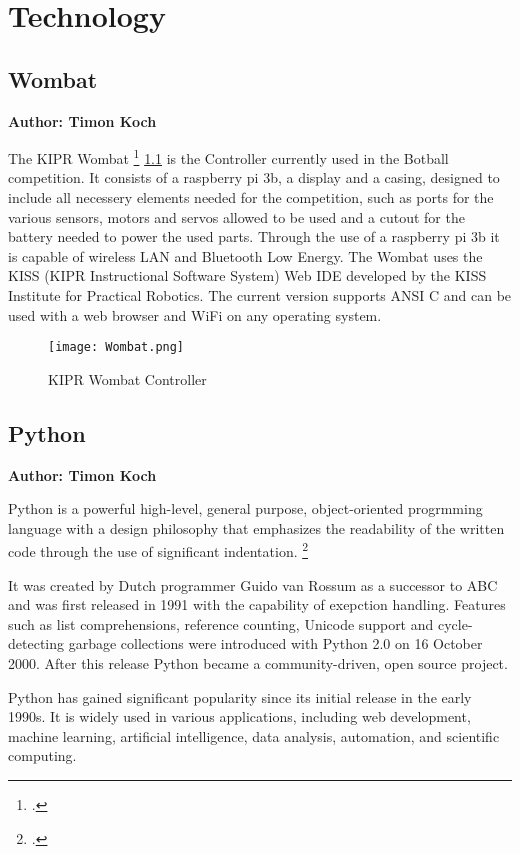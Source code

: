\chapter{Technology}


\section{Wombat}
\textbf{Author: Timon Koch}

The KIPR Wombat \footcite{wombat-controller} \ref{fig:wombat} is the Controller currently used in the Botball competition. It consists of a raspberry pi 3b, a display and a casing, designed to include all necessery elements needed for the competition, such as ports for the various sensors, motors and servos allowed to be used and a cutout for the battery needed to power the used parts. Through the use of a raspberry pi 3b it is capable of wireless LAN and Bluetooth Low Energy. The Wombat uses the KISS (KIPR Instructional Software System) Web IDE developed by the KISS Institute for Practical Robotics. The current version supports ANSI C and can be used with a web browser and WiFi on any operating system.

\begin{figure}[h]
	\centering
	\texttt{[image: Wombat.png]} 
	\caption{KIPR Wombat Controller}
    \label{fig:wombat}
\end{figure}


\section{Python}
\textbf{Author: Timon Koch}

Python is a powerful high-level, general purpose, object-oriented progrmming language with a design philosophy that emphasizes the readability of the written code through the use of significant indentation. \footcite{python_main_site} 

It was created by Dutch programmer Guido van Rossum as a successor to ABC and was first released in 1991 with the capability of exepction handling. 
Features such as list comprehensions, reference counting, Unicode support and cycle-detecting garbage collections were introduced with Python 2.0 on 16 October 2000. After this release Python became a community-driven, open source project.

Python has gained significant popularity since its initial release in the early 1990s. It is widely used in various applications, including web development, machine learning, artificial intelligence, data analysis, automation, and scientific computing. 

